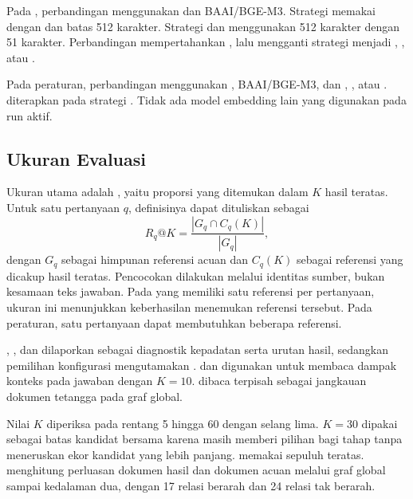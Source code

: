 Pada , perbandingan  menggunakan  dan BAAI/BGE-M3. Strategi  memakai  dengan  dan batas 512 karakter. Strategi  dan  menggunakan 512 karakter dengan  51 karakter. Perbandingan  mempertahankan , lalu mengganti strategi menjadi , , atau .

Pada peraturan, perbandingan menggunakan , BAAI/BGE-M3, dan , , atau .  diterapkan pada strategi . Tidak ada model embedding lain yang digunakan pada run aktif.

\subsection{Ukuran Evaluasi}
Ukuran utama adalah , yaitu proporsi  yang ditemukan dalam $K$ hasil teratas. Untuk satu pertanyaan $q$, definisinya dapat dituliskan sebagai
\begin{equation}
R_q@K=\frac{|G_q\cap C_q(K)|}{|G_q|},
\end{equation}
dengan $G_q$ sebagai himpunan referensi acuan dan $C_q(K)$ sebagai referensi yang dicakup hasil teratas. Pencocokan dilakukan melalui identitas sumber, bukan kesamaan teks jawaban. Pada  yang memiliki satu referensi per pertanyaan, ukuran ini menunjukkan keberhasilan menemukan referensi tersebut. Pada peraturan, satu pertanyaan dapat membutuhkan beberapa referensi.

, , dan  dilaporkan sebagai diagnostik kepadatan serta urutan hasil, sedangkan pemilihan konfigurasi mengutamakan .  dan  digunakan untuk membaca dampak konteks pada jawaban dengan $K = 10$.  dibaca terpisah sebagai jangkauan dokumen tetangga pada graf global.

Nilai $K$ diperiksa pada rentang 5 hingga 60 dengan selang lima. $K = 30$ dipakai sebagai batas kandidat bersama karena masih memberi pilihan bagi tahap  tanpa meneruskan ekor kandidat yang lebih panjang.  memakai sepuluh  teratas.  menghitung perluasan dokumen hasil dan dokumen acuan melalui graf global sampai kedalaman dua, dengan 17 relasi berarah dan 24 relasi tak berarah.

